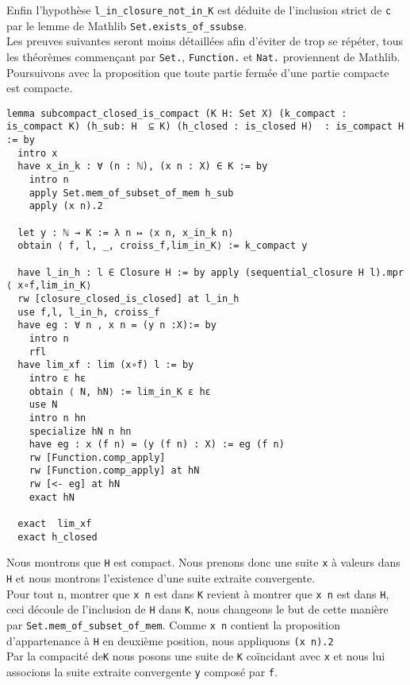 \documentclass[a4paper, 12pt]{article}
\newcommand{\lean}[1]{\texttt{#1}}
\begin{document}
Enfin l'hypothèse \lean{l_in_closure_not_in_K} est déduite de l'inclusion strict de \lean{c} par le lemme de Mathlib \lean{Set.exists_of_ssubse}.\\


Les preuves suivantes seront moins détaillées afin d'éviter de trop se répéter, tous les théorèmes commençant par \lean{Set.}, \lean{Function.} et \lean{Nat.} proviennent de Mathlib. Poursuivons avec la proposition que toute partie fermée d'une partie compacte est compacte.\\


\begin{verbatim}   
lemma subcompact_closed_is_compact (K H: Set X) (k_compact : is_compact K) (h_sub: H  ⊆ K) (h_closed : is_closed H)  : is_compact H := by
  intro x
  have x_in_k : ∀ (n : ℕ), (x n : X) ∈ K := by
    intro n
    apply Set.mem_of_subset_of_mem h_sub
    apply (x n).2

  let y : ℕ → K := λ n ↦ ⟨x n, x_in_k n⟩
  obtain ⟨ f, l, _, croiss_f,lim_in_K⟩ := k_compact y

  have l_in_h : l ∈ Closure H := by apply (sequential_closure H l).mpr  ⟨ x∘f,lim_in_K⟩
  rw [closure_closed_is_closed] at l_in_h
  use f,l, l_in_h, croiss_f
  have eg : ∀ n , x n = (y n :X):= by
    intro n
    rfl
  have lim_xf : lim (x∘f) l := by
    intro ε hε
    obtain ⟨ N, hN⟩ := lim_in_K ε hε
    use N
    intro n hn
    specialize hN n hn
    have eg : x (f n) = (y (f n) : X) := eg (f n)
    rw [Function.comp_apply]
    rw [Function.comp_apply] at hN
    rw [<- eg] at hN
    exact hN
    
  exact  lim_xf
  exact h_closed
\end{verbatim}

Nous montrons que \lean{H} est compact. Nous prenons donc une suite \lean{x} à valeurs dans \lean{H} et nous montrons l'existence d'une suite extraite convergente.\\

Pour tout n, montrer que \lean{x n} est dans \lean{K} revient à montrer que \lean{x n} est dans \lean{H}, ceci découle de l'inclusion de \lean{H} dans \lean{K}, nous changeons le but de cette manière par \lean{Set.mem_of_subset_of_mem}. Comme \lean{x n} contient la proposition d'appartenance à \lean{H} en deuxième position, nous appliquons \lean{(x n).2}\\

Par la compacité de\lean{K} nous posons une suite de \lean{K} coïncidant avec \lean{x} et nous lui associons la suite extraite convergente \lean{y} composé par \lean{f}.\\
\end{document}
